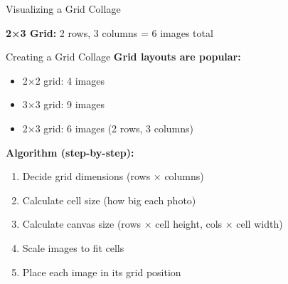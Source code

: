 \documentclass{csbeamer}
\begin{document}
\begin{frame}{Visualizing a Grid Collage}
    \begin{center}
    \end{center}

    \textbf{2×3 Grid:} 2 rows, 3 columns = 6 images total
\end{frame}

\begin{frame}{Creating a Grid Collage}
    \textbf{Grid layouts are popular:}

    \vspace{1em}

    \begin{itemize}
        \item 2×2 grid: 4 images
        \item 3×3 grid: 9 images
        \item 2×3 grid: 6 images (2 rows, 3 columns)
    \end{itemize}

    \vspace{1em}

    \textbf{Algorithm (step-by-step):}
    \begin{enumerate}
        \item Decide grid dimensions (rows × columns)
        \item Calculate cell size (how big each photo)
        \item Calculate canvas size (rows × cell height, cols × cell width)
        \item Scale images to fit cells
        \item Place each image in its grid position
    \end{enumerate}
\end{frame}
\end{document}
